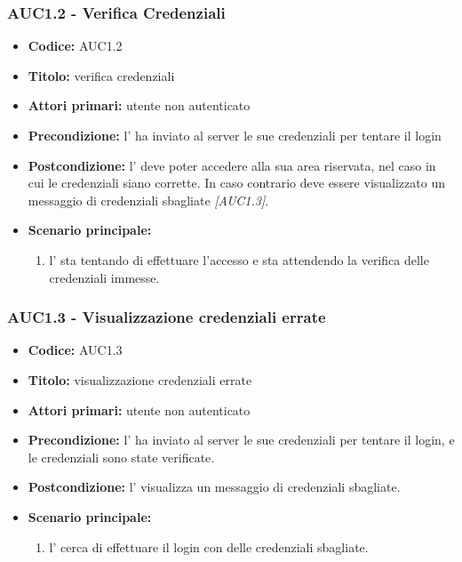 \documentclass[casi-duso]{subfiles}
\begin{document}
\subsubsection{AUC1.2 - Verifica Credenziali}%
\label{subsub:AUC1.2}
\begin{itemize}
  \item \textbf{Codice:} AUC1.2
  \item \textbf{Titolo:} verifica credenziali
  \item \textbf{Attori primari:} utente non autenticato
  \item \textbf{Precondizione:} l' ha inviato al server le sue credenziali per tentare il login
  \item \textbf{Postcondizione:} l' deve poter accedere alla sua area riservata, nel caso in cui le credenziali siano corrette. In caso
  contrario deve essere visualizzato un messaggio di credenziali sbagliate \emph{[AUC1.3]}.
  \item \textbf{Scenario principale:}
  \begin{enumerate}
    \item l' sta tentando di effettuare l'accesso e sta attendendo la verifica delle credenziali immesse.
  \end{enumerate}
\end{itemize}

\subsubsection{AUC1.3 - Visualizzazione credenziali errate}%
\label{subsub:AUC1.3}
\begin{itemize}
  \item \textbf{Codice:} AUC1.3
  \item \textbf{Titolo:} visualizzazione credenziali errate
  \item \textbf{Attori primari:} utente non autenticato
  \item \textbf{Precondizione:} l' ha inviato al server le sue credenziali per tentare il login, e le credenziali sono state verificate.
  \item \textbf{Postcondizione:} l' visualizza un messaggio di credenziali sbagliate.
  \item \textbf{Scenario principale:}
  \begin{enumerate}
    \item l' cerca di effettuare il login con delle credenziali sbagliate.
  \end{enumerate}
\end{itemize}
\end{document}

